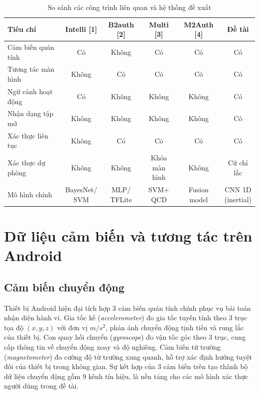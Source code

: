 \documentclass[../DoAn.tex]{subfiles}
\begin{document}
\begin{table}[H]
    \centering
    \caption{So sánh các công trình liên quan và hệ thống đề xuất}
    \label{tab:related_work_compare}
    \renewcommand{\arraystretch}{1.5}
    \begin{tabularx}{\textwidth}{|>{\raggedright\arraybackslash}X|c|c|c|c|c|}
    \hline
    \textbf{Tiêu chí} & \textbf{Intelli [1]} & \textbf{B2auth [2]} 
        & \textbf{Multi [3]} & \textbf{M2Auth [4]} & \textbf{Đề tài} \\
    \hline
    Cảm biến quán tính   & Có    & Không & Có    & Có    & Có \\
    \hline
    Tương tác màn hình   & Không & Có    & Có    & Có    & Có \\
    \hline
    Ngữ cảnh hoạt động   & Có    & Không & Không & Không & Có \\
    \hline
    Nhận dạng tập mở     & Không & Không & Không & Không & Có \\
    \hline
    Xác thực liên tục    & Không & Có    & Có    & Có    & Có \\
    \hline
    Xác thực dự phòng    & Không & Không 
        & \makecell{Khóa\\màn hình} & Không 
        & \makecell{Cử chỉ\\lắc} \\
    \hline
    Mô hình chính        & \makecell{BayesNet/\\SVM} 
        & \makecell{MLP/\\TFLite} & \makecell{SVM+\\QCD} 
        & \makecell{Fusion\\model} & \makecell{CNN 1D\\(inertial)} \\
    \hline
    \end{tabularx}
\end{table}

\section{Dữ liệu cảm biến và tương tác trên Android}
\label{sec:cambien}

\subsection{Cảm biến chuyển động}

Thiết bị Android hiện đại tích hợp 3 cảm biến quán tính chính phục vụ bài toán nhận diện hành vi. Gia tốc kế (\textit{accelerometer}) đo gia tốc tuyến tính theo 3 trục tọa độ $(x, y, z)$ với đơn vị $m/s^2$, phản ánh chuyển động tịnh tiến và rung lắc của thiết bị. Con quay hồi chuyển 
(\textit{gyroscope}) đo vận tốc góc theo 3 trục, cung cấp thông tin về 
chuyển động xoay và độ nghiêng. Cảm biến từ trường (\textit{magnetometer}) 
đo cường độ từ trường xung quanh, hỗ trợ xác định hướng tuyệt đối của 
thiết bị trong không gian. Sự kết hợp của 3 cảm biến trên tạo thành bộ 
dữ liệu chuyển động gồm 9 kênh tín hiệu, là nền tảng cho các mô hình xác 
thực người dùng trong đề tài.
\end{document}
